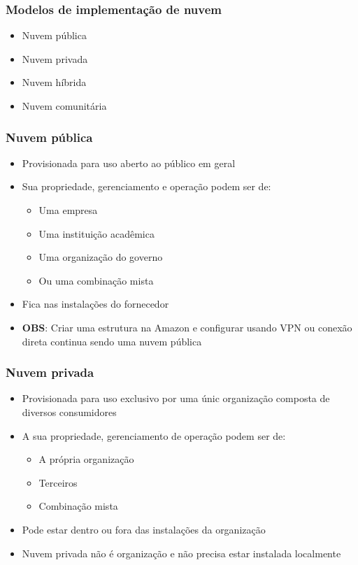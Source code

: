 \begin{frame}
	\frametitle{Modelos de implementação de nuvem}
	\begin{itemize}
		\item Nuvem pública
		\item Nuvem privada
		\item Nuvem híbrida
		\item Nuvem comunitária
	\end{itemize}
\end{frame}

\begin{frame}
	\frametitle{Nuvem pública}
	\begin{itemize}
		\item Provisionada para uso aberto ao público em geral
		\item Sua propriedade, gerenciamento e operação podem ser de:
			\begin{itemize}
				\item Uma empresa
				\item Uma instituição acadêmica
				\item Uma organização do governo
				\item Ou uma combinação mista
			\end{itemize}
		\item Fica nas instalações do fornecedor
	\item \textbf{OBS}: Criar uma estrutura na Amazon e configurar usando VPN ou conexão direta continua sendo uma nuvem pública
	\end{itemize}
\end{frame}

\begin{frame}
	\frametitle{Nuvem privada}
	\begin{itemize}
		\item Provisionada para uso exclusivo por uma únic organização composta de diversos consumidores
		\item A sua propriedade, gerenciamento de operação podem ser de:
			\begin{itemize}
				\item A própria organização
				\item Terceiros
				\item Combinação mista
			\end{itemize}
		\item Pode estar dentro ou fora das instalações da organização
		\item Nuvem privada não é organização e não precisa estar instalada localmente
	\end{itemize}
\end{frame}

